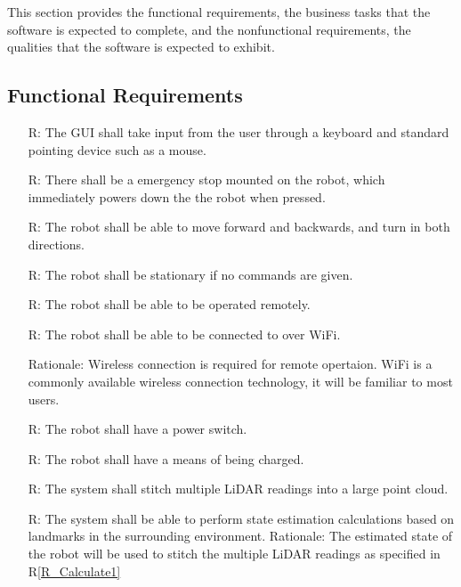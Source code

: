 \documentclass[12pt]{article}
\newcounter{reqnum} %
\newcommand{\rref}[1]{R\ref{#1}}
\begin{document}

This section provides the functional requirements, the business tasks that the
software is expected to complete, and the nonfunctional requirements, the
qualities that the software is expected to exhibit.

\subsection{Functional Requirements}

\noindent \begin{itemize}

\item[R\refstepcounter{reqnum}\thereqnum \label{R_Inputs1}:] The GUI shall take input from the user through a keyboard and standard pointing device such as a mouse.
\item[R\refstepcounter{reqnum}\thereqnum \label{R_Inputs2}:] There shall be a emergency stop mounted on the robot, which immediately powers down the the robot when pressed.
\item[R\refstepcounter{reqnum}\thereqnum \label{R_Inputs3}:] The robot shall be able to move forward and backwards, and turn in both directions.
\item[R\refstepcounter{reqnum}\thereqnum \label{R_Inputs4}:] The robot shall be stationary if no commands are given.
\item[R\refstepcounter{reqnum}\thereqnum \label{R_Inputs5}:] The robot shall be able to be operated remotely.
\item[R\refstepcounter{reqnum}\thereqnum \label{R_Inputs6}:] The robot shall be able to be connected to over WiFi.
\item[\newline Rationale: Wireless connection is required for remote opertaion. WiFi is a commonly available wireless connection technology, it will be familiar to most users.] 
\item[R\refstepcounter{reqnum}\thereqnum \label{R_Inputs7}:] The robot shall have a power switch.
\item[R\refstepcounter{reqnum}\thereqnum \label{R_Inputs8}:] The robot shall have a means of being charged.

\item[R\refstepcounter{reqnum}\thereqnum \label{R_Calculate1}:] The system shall stitch multiple LiDAR readings into a large point cloud.
\item[R\refstepcounter{reqnum}\thereqnum \label{R_Calculate2}:] The system shall be able to perform state estimation calculations based on landmarks in the surrounding environment.
\newline Rationale: The estimated state of the robot will be used to stitch the multiple LiDAR readings as specified in \rref{R_Calculate1} 


\end{itemize}
\end{document}
